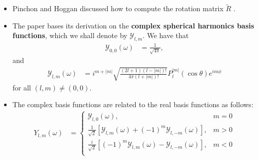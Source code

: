 \documentclass[10pt]{article}
\begin{document}
    \begin{itemize}
        \item Pinchon and Hoggan discussed how to compute the rotation matrix $\tilde{R}$ \cite{Pinchon:2007}.

        \item The paper bases its derivation on the \textbf{complex spherical harmonics basis functions}, which we shall denote by $\mathcal{Y}_{l,m}$.  We have that
        \begin{align*}
            \mathcal{Y}_{0,0}(\omega) &= \frac{1}{\sqrt{4\pi}},
        \end{align*}
        and
        \begin{align*}
            \mathcal{Y}_{l,m}(\omega) &= i^{m+|m|} \sqrt{\frac{(2l+1)(l-|m|)!}{4\pi(l+|m|)!}} P_l^{|m|}(\cos\theta) e^{im\phi}
        \end{align*}
        for all $(l,m) \neq (0,0)$.

        \item The complex basis functions are related to the real basis functions as follows:
        \begin{align*}
            Y_{l,m}(\omega) &= \begin{cases}
                \mathcal{Y}_{l,0}(\omega), & m=0 \\
                \frac{1}{\sqrt{2}}[\mathcal{Y}_{l,m}(\omega) + (-1)^m \mathcal{Y}_{l,-m}(\omega)] , & m>0 \\
                \frac{i}{\sqrt{2}}[(-1)^m \mathcal{Y}_{l,m}(\omega) - \mathcal{Y}_{l,-m}(\omega)] , & m<0 \\
            \end{cases}
        \end{align*}


\end{itemize}
\end{document}
